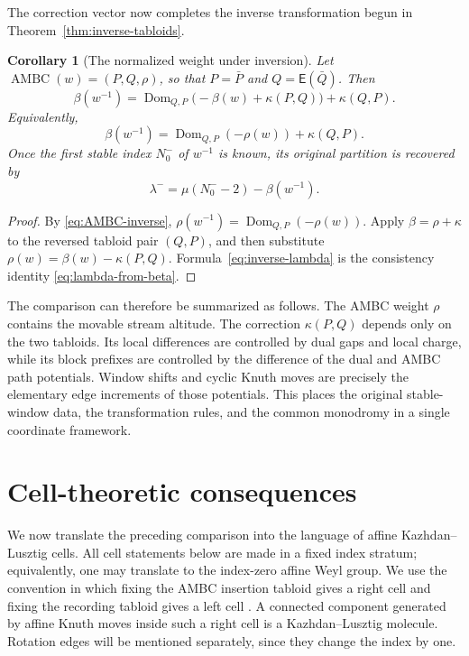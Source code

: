 \documentclass[11pt]{article}
\newtheorem{corollary}[theorem]{Corollary}
\theoremstyle{definition}
\theoremstyle{remark}
\newcommand{\AMBC}{\operatorname{AMBC}}
\newcommand{\Dom}{\operatorname{Dom}}
\newcommand{\E}{\mathsf E}
\begin{document}
The correction vector now completes the inverse transformation begun in
Theorem~\ref{thm:inverse-tabloids}.

\begin{corollary}[The normalized weight under inversion]\label{cor:inverse-beta}
Let \(\AMBC(w)=(P,Q,\rho)\), so that
\(P=\bar P\) and \(Q=\E(\bar Q)\).  Then
\begin{equation}\label{eq:inverse-beta-final}
 \beta(w^{-1})
 =\Dom_{Q,P}\!\bigl(-\beta(w)+\kappa(P,Q)\bigr)
  +\kappa(Q,P).
\end{equation}
Equivalently,
\begin{equation}\label{eq:inverse-beta-rho}
 \beta(w^{-1})=\Dom_{Q,P}(-\rho(w))+\kappa(Q,P).
\end{equation}
Once the first stable index \(N_0^-\) of \(w^{-1}\) is known, its original partition is
recovered by
\begin{equation}\label{eq:inverse-lambda}
 \lambda^- =\mu(N_0^--2)-\beta(w^{-1}).
\end{equation}
\end{corollary}

\begin{proof}
By \eqref{eq:AMBC-inverse},
\(\rho(w^{-1})=\Dom_{Q,P}(-\rho(w))\).  Apply
\(\beta=\rho+\kappa\) to the reversed tabloid pair \((Q,P)\), and then substitute
\(\rho(w)=\beta(w)-\kappa(P,Q)\).  Formula~\eqref{eq:inverse-lambda} is the consistency
identity \eqref{eq:lambda-from-beta}.
\end{proof}

The comparison can therefore be summarized as follows.  The AMBC weight \(\rho\)
contains the movable stream altitude.  The correction \(\kappa(P,Q)\) depends only on
the two tabloids.  Its local differences are controlled by dual gaps and local charge,
while its block prefixes are controlled by the difference of the dual and AMBC path
potentials.  Window shifts and cyclic Knuth moves are precisely the elementary edge
increments of those potentials.  This places the original stable-window data, the
transformation rules, and the common monodromy in a single coordinate framework.

\section{Cell-theoretic consequences}\label{sec:cells}

We now translate the preceding comparison into the language of affine
Kazhdan--Lusztig cells.  All cell statements below are made in a fixed index stratum;
equivalently, one may translate to the index-zero affine Weyl group.  We use the
convention in which fixing the AMBC insertion tabloid gives a right cell and fixing the
recording tabloid gives a left cell \cite{CPY18,CLP18}.  A connected component generated
by affine Knuth moves inside such a right cell is a Kazhdan--Lusztig molecule.  Rotation
edges will be mentioned separately, since they change the index by one.
\end{document}
